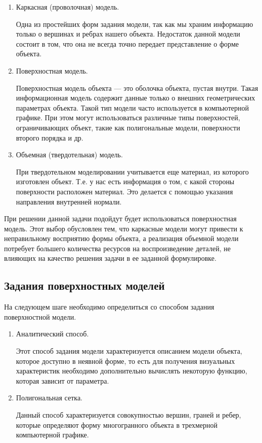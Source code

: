 \begin{enumerate}
	\item Каркасная (проволочная) модель.
	
	Одна из простейших форм задания модели, так как мы храним информацию только о вершинах и ребрах нашего объекта. Недостаток данной модели состоит в том, что она не всегда точно передает представление о форме объекта.
	
	\item Поверхностная модель.
	
	Поверхностная модель объекта — это оболочка объекта, пустая внутри. Такая информационная модель содержит данные только о внешних геометрических параметрах объекта. Такой тип модели часто используется в компьютерной графике. При этом могут использоваться различные типы поверхностей, ограничивающих объект, такие как полигональные модели, поверхности второго порядка и др.
	
	\item  Объемная (твердотельная) модель.
	
	При твердотельном моделировании учитывается еще материал, из которого изготовлен объект. Т.е. у нас есть информация о том, с какой стороны поверхности расположен материал. Это делается с помощью указания направления внутренней нормали.

\end{enumerate}

При решении данной задачи подойдут будет использоваться поверхностная модель. Этот выбор обусловлен тем, что каркасные модели могут привести к неправильному восприятию формы объекта, а реализация объемной модели потребует большего количества ресурсов на воспроизведение деталей, не влияющих на качество решения задачи в ее заданной формулировке.



\subsection{Задания поверхностных моделей}
На следующем шаге необходимо определиться со способом задания поверхностной модели.

\begin{enumerate} 
\item Аналитический способ.

 Этот способ задания модели характеризуется описанием модели объекта, которое доступно в неявной форме, то есть для получения визуальных характеристик необходимо дополнительно вычислять некоторую функцию, которая зависит от параметра.

\item Полигональная сетка.

 Данный способ характеризуется совокупностью вершин, граней и ребер, которые определяют форму многогранного объекта в трехмерной компьютерной графике.

\end{enumerate}


